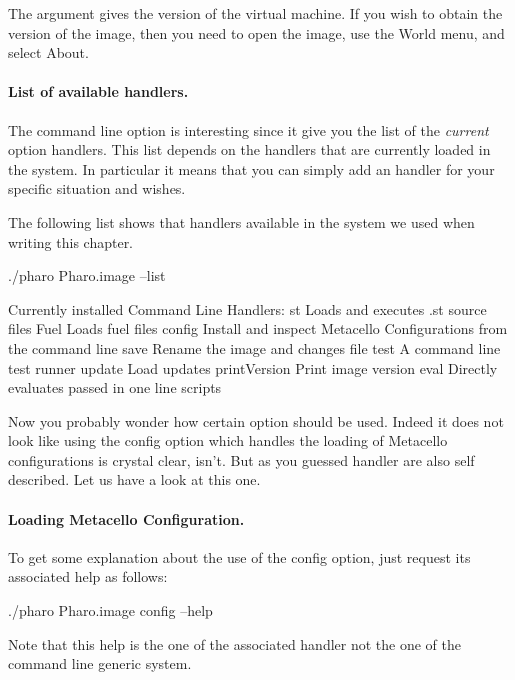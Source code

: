 \documentclass[a4paper,10pt,twoside]{book}
\begin{document}
The  argument gives the version of the virtual machine. If you wish to obtain the version of the image, then you need to open the image, use the World menu, and select About.

\paragraph{List of available handlers.} The command line option  is interesting since it give you the list of the \emph{current} option handlers. This list depends on the handlers that are currently loaded in the system. In particular it means that you can simply add an handler for your specific situation and wishes.

The following list shows that handlers available in the system we used when writing this chapter.

\begin{code}{}
./pharo Pharo.image --list

Currently installed Command Line Handlers:
    st              Loads and executes .st source files
    Fuel            Loads fuel files
    config          Install and inspect Metacello Configurations from the command line
    save            Rename the image and changes file
    test            A command line test runner
    update          Load updates
    printVersion    Print image version
    eval            Directly evaluates passed in one line scripts
\end{code}

Now you probably wonder how certain option should be used. Indeed it does not look like using the config option which handles the loading of Metacello configurations is crystal clear, isn't. But as you guessed handler are also self described. Let us have a look at this one. 



\paragraph{Loading Metacello Configuration.}
To get some explanation about the use of the config option, just request its associated help as follows: 

\begin{code}{}
./pharo Pharo.image config --help
\end{code}

Note that this help is the one of the associated handler not the one of the command line generic system. 
\end{document}
